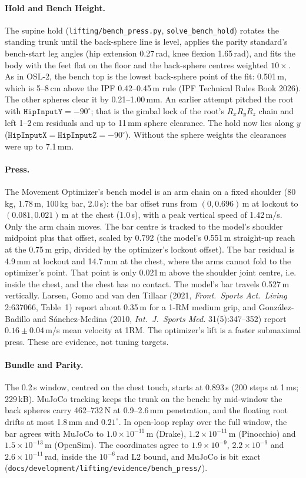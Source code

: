\documentclass[11pt,a4paper]{article}
\begin{document}
\paragraph{Hold and Bench Height.} The supine hold
(\texttt{lifting/bench\_press.py}, \texttt{solve\_bench\_hold}) rotates the
standing trunk until the back-sphere line is level, applies the parity
standard's bench-start leg angles (hip extension 0.27\,rad, knee flexion
1.65\,rad), and fits the body with the feet flat on the floor and the
back-sphere centres weighted $10\times$. As in OSL-2, the bench top is the
lowest back-sphere point of the fit: 0.501\,m, which is 5--8\,cm above the
IPF 0.42--0.45\,m rule (IPF Technical Rules Book 2026). The other spheres
clear it by 0.21--1.00\,mm. An earlier attempt pitched the root with
$\texttt{HipInputY}=-90^\circ$; that is the gimbal lock of the root's
$R_xR_yR_z$ chain and left 1--2\,cm residuals and up to 11\,mm sphere
clearance. The hold now lies along $y$
($\texttt{HipInputX}=\texttt{HipInputZ}=-90^\circ$). Without the sphere
weights the clearances were up to 7.1\,mm.

\paragraph{Press.} The Movement Optimizer's bench model is an arm chain on a
fixed shoulder (80\,kg, 1.78\,m, 100\,kg bar, 2.0\,s): the bar offset runs from
$(0, 0.696)$\,m at lockout to $(0.081, 0.021)$\,m at the chest (1.0\,s), with a
peak vertical speed of 1.42\,m/s. Only the arm chain moves. The bar centre
is tracked to the model's shoulder midpoint plus that offset, scaled by
0.792 (the model's 0.551\,m straight-up reach at the 0.75\,m grip, divided by
the optimizer's lockout offset). The bar residual is 4.9\,mm at lockout and
14.7\,mm at the chest, where the arms cannot fold to the optimizer's point.
That point is only 0.021\,m above the shoulder joint centre, i.e. inside
the chest, and the chest has no contact. The model's bar travels 0.527\,m
vertically. Larsen, Gomo and van den Tillaar (2021, \emph{Front.\ Sports
Act.\ Living} 2:637066, Table~1) report about 0.35\,m for a 1-RM medium grip,
and Gonz\'alez-Badillo and S\'anchez-Medina (2010, \emph{Int.\ J.\ Sports
Med.} 31(5):347--352) report $0.16\pm0.04$\,m/s mean velocity at 1RM. The optimizer's lift is a faster
submaximal press. These are evidence, not tuning targets.

\paragraph{Bundle and Parity.} The 0.2\,s window, centred on the chest touch,
starts at 0.893\,s (200 steps at 1\,ms; 229\,kB). MuJoCo tracking keeps the
trunk on the bench: by mid-window the back spheres carry 462--732\,N at
0.9--2.6\,mm penetration, and the floating root drifts at most 1.8\,mm and
$0.21^\circ$. In open-loop replay over the full window, the bar agrees with
MuJoCo to $1.0\times10^{-11}$\,m (Drake), $1.2\times10^{-11}$\,m (Pinocchio)
and $1.5\times10^{-13}$\,m (OpenSim). The coordinates agree to
$1.9\times10^{-9}$, $2.2\times10^{-9}$ and $2.6\times10^{-11}$\,rad, inside the
$10^{-6}$\,rad L2 bound, and MuJoCo is bit exact
(\texttt{docs/development/lifting/evidence/bench\_press/}).
\end{document}
